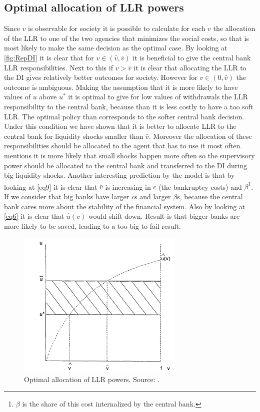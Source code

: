 \documentclass[twoside, 12pt]{article}
\numberwithin{equation}{section}
\begin{document}
\subsection{Optimal allocation of LLR powers}
Since $v$ is observable for society it is possible to calculate for each $v$ the allocation of the LLR to one of the two agencies that minimizes the social costs, so that is most likely to make the same decision as the optimal case. By looking at \autoref{fig:RepDI} it is clear that for $v \in(\hat{v},\bar{v})$ it is beneficial to give the central bank LLR responsibilities. Next to this if $v>\bar{v}$ it is clear that allocating the LLR to the DI gives relatively better outcomes for society. However for $v\in(0,\hat{v})$ the outcome is ambiguous. Making the assumption that it is more likely to have values of $u$ above $u^*$ it is optimal to give for low values of withdrawals the LLR responsibility to the central bank, because than it is less costly to have a too soft LLR. The optimal policy than corresponds to the softer central bank decision. Under this condition we have shown that it is better to allocate LLR to the central bank for liquidity shocks smaller than $\bar{v}$. Moreover the allocation of these responsibilities should be allocated to the agent that has to use it most often.  mentions it is more likely that small shocks happen more often so the supervisory power should be allocated to the central bank and transferred to the DI during big liquidity shocks. Another interesting prediction by the model is that by looking at \eqref{eq9} it is clear that $\bar{v}$ is increasing in $c$ (the bankruptcy costs) and $\beta$\footnote{$\beta$ is the share of this cost internalized by the central bank.}. If we consider that big banks have larger $c$s and larger $\beta$s, because the central bank cares more about the stability of the financial system. Also by looking at \eqref{eq6} it is clear that $\hat{u}(v)$ would shift down. Result is that bigger banks are more likely to be saved, leading to a too big to fail result.

\begin{figure}[htbp]
\begin{centering}
\includegraphics[width=8cm]{Repullo2000DI.png}
\caption{Optimal allocation of LLR powers. Source: \protect{}.}
\label{fig:RepDI}
\end{centering}
\end{figure}
\end{document}
